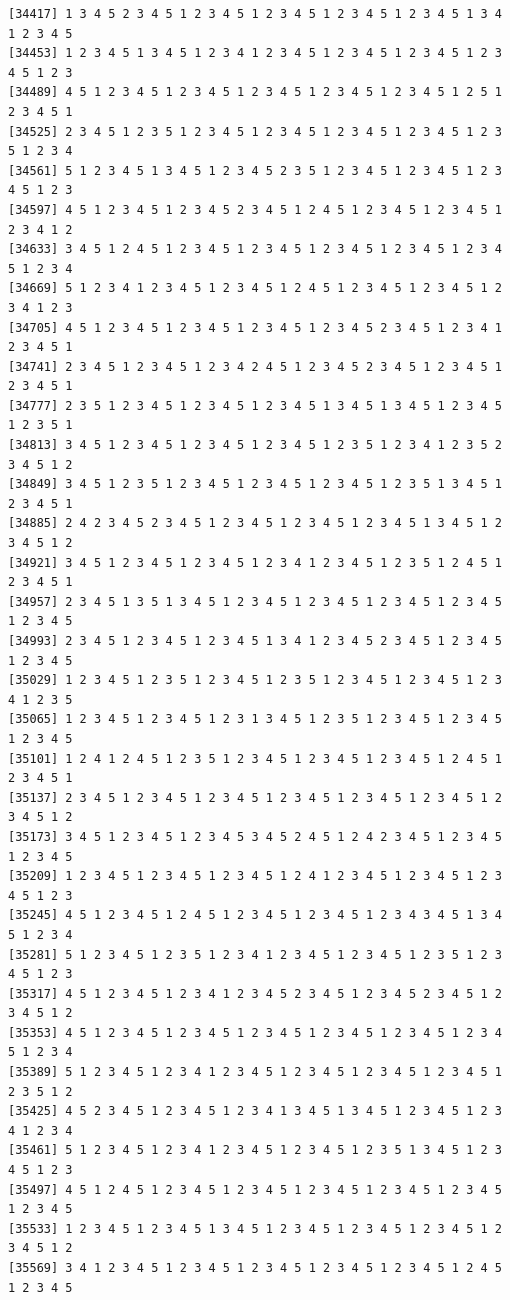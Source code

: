 \documentclass[
  11pt,
]{book}
\begin{document}
\begin{verbatim}
[34417] 1 3 4 5 2 3 4 5 1 2 3 4 5 1 2 3 4 5 1 2 3 4 5 1 2 3 4 5 1 3 4 1 2 3 4 5
[34453] 1 2 3 4 5 1 3 4 5 1 2 3 4 1 2 3 4 5 1 2 3 4 5 1 2 3 4 5 1 2 3 4 5 1 2 3
[34489] 4 5 1 2 3 4 5 1 2 3 4 5 1 2 3 4 5 1 2 3 4 5 1 2 3 4 5 1 2 5 1 2 3 4 5 1
[34525] 2 3 4 5 1 2 3 5 1 2 3 4 5 1 2 3 4 5 1 2 3 4 5 1 2 3 4 5 1 2 3 5 1 2 3 4
[34561] 5 1 2 3 4 5 1 3 4 5 1 2 3 4 5 2 3 5 1 2 3 4 5 1 2 3 4 5 1 2 3 4 5 1 2 3
[34597] 4 5 1 2 3 4 5 1 2 3 4 5 2 3 4 5 1 2 4 5 1 2 3 4 5 1 2 3 4 5 1 2 3 4 1 2
[34633] 3 4 5 1 2 4 5 1 2 3 4 5 1 2 3 4 5 1 2 3 4 5 1 2 3 4 5 1 2 3 4 5 1 2 3 4
[34669] 5 1 2 3 4 1 2 3 4 5 1 2 3 4 5 1 2 4 5 1 2 3 4 5 1 2 3 4 5 1 2 3 4 1 2 3
[34705] 4 5 1 2 3 4 5 1 2 3 4 5 1 2 3 4 5 1 2 3 4 5 2 3 4 5 1 2 3 4 1 2 3 4 5 1
[34741] 2 3 4 5 1 2 3 4 5 1 2 3 4 2 4 5 1 2 3 4 5 2 3 4 5 1 2 3 4 5 1 2 3 4 5 1
[34777] 2 3 5 1 2 3 4 5 1 2 3 4 5 1 2 3 4 5 1 3 4 5 1 3 4 5 1 2 3 4 5 1 2 3 5 1
[34813] 3 4 5 1 2 3 4 5 1 2 3 4 5 1 2 3 4 5 1 2 3 5 1 2 3 4 1 2 3 5 2 3 4 5 1 2
[34849] 3 4 5 1 2 3 5 1 2 3 4 5 1 2 3 4 5 1 2 3 4 5 1 2 3 5 1 3 4 5 1 2 3 4 5 1
[34885] 2 4 2 3 4 5 2 3 4 5 1 2 3 4 5 1 2 3 4 5 1 2 3 4 5 1 3 4 5 1 2 3 4 5 1 2
[34921] 3 4 5 1 2 3 4 5 1 2 3 4 5 1 2 3 4 1 2 3 4 5 1 2 3 5 1 2 4 5 1 2 3 4 5 1
[34957] 2 3 4 5 1 3 5 1 3 4 5 1 2 3 4 5 1 2 3 4 5 1 2 3 4 5 1 2 3 4 5 1 2 3 4 5
[34993] 2 3 4 5 1 2 3 4 5 1 2 3 4 5 1 3 4 1 2 3 4 5 2 3 4 5 1 2 3 4 5 1 2 3 4 5
[35029] 1 2 3 4 5 1 2 3 5 1 2 3 4 5 1 2 3 5 1 2 3 4 5 1 2 3 4 5 1 2 3 4 1 2 3 5
[35065] 1 2 3 4 5 1 2 3 4 5 1 2 3 1 3 4 5 1 2 3 5 1 2 3 4 5 1 2 3 4 5 1 2 3 4 5
[35101] 1 2 4 1 2 4 5 1 2 3 5 1 2 3 4 5 1 2 3 4 5 1 2 3 4 5 1 2 4 5 1 2 3 4 5 1
[35137] 2 3 4 5 1 2 3 4 5 1 2 3 4 5 1 2 3 4 5 1 2 3 4 5 1 2 3 4 5 1 2 3 4 5 1 2
[35173] 3 4 5 1 2 3 4 5 1 2 3 4 5 3 4 5 2 4 5 1 2 4 2 3 4 5 1 2 3 4 5 1 2 3 4 5
[35209] 1 2 3 4 5 1 2 3 4 5 1 2 3 4 5 1 2 4 1 2 3 4 5 1 2 3 4 5 1 2 3 4 5 1 2 3
[35245] 4 5 1 2 3 4 5 1 2 4 5 1 2 3 4 5 1 2 3 4 5 1 2 3 4 3 4 5 1 3 4 5 1 2 3 4
[35281] 5 1 2 3 4 5 1 2 3 5 1 2 3 4 1 2 3 4 5 1 2 3 4 5 1 2 3 5 1 2 3 4 5 1 2 3
[35317] 4 5 1 2 3 4 5 1 2 3 4 1 2 3 4 5 2 3 4 5 1 2 3 4 5 2 3 4 5 1 2 3 4 5 1 2
[35353] 4 5 1 2 3 4 5 1 2 3 4 5 1 2 3 4 5 1 2 3 4 5 1 2 3 4 5 1 2 3 4 5 1 2 3 4
[35389] 5 1 2 3 4 5 1 2 3 4 1 2 3 4 5 1 2 3 4 5 1 2 3 4 5 1 2 3 4 5 1 2 3 5 1 2
[35425] 4 5 2 3 4 5 1 2 3 4 5 1 2 3 4 1 3 4 5 1 3 4 5 1 2 3 4 5 1 2 3 4 1 2 3 4
[35461] 5 1 2 3 4 5 1 2 3 4 1 2 3 4 5 1 2 3 4 5 1 2 3 5 1 3 4 5 1 2 3 4 5 1 2 3
[35497] 4 5 1 2 4 5 1 2 3 4 5 1 2 3 4 5 1 2 3 4 5 1 2 3 4 5 1 2 3 4 5 1 2 3 4 5
[35533] 1 2 3 4 5 1 2 3 4 5 1 3 4 5 1 2 3 4 5 1 2 3 4 5 1 2 3 4 5 1 2 3 4 5 1 2
[35569] 3 4 1 2 3 4 5 1 2 3 4 5 1 2 3 4 5 1 2 3 4 5 1 2 3 4 5 1 2 4 5 1 2 3 4 5

\end{verbatim}
\end{document}
